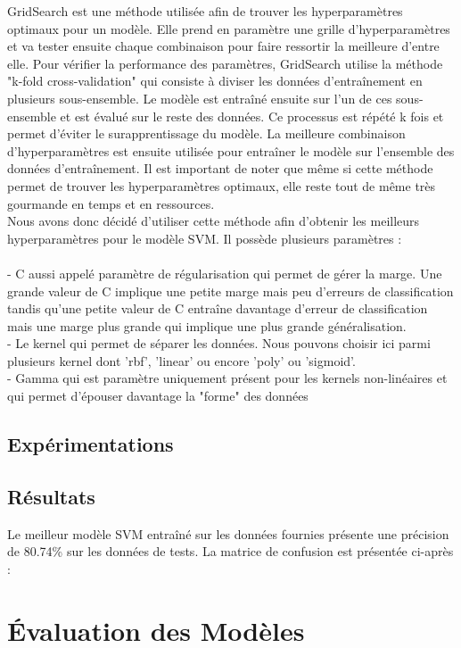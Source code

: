 \documentclass{rapport}
\begin{document}
GridSearch est une méthode utilisée afin de trouver les hyperparamètres optimaux pour un modèle. Elle prend en paramètre une grille
d'hyperparamètres et va tester ensuite chaque combinaison pour faire ressortir la meilleure d'entre elle. Pour vérifier la performance
des paramètres, GridSearch utilise la méthode "k-fold cross-validation" qui consiste à diviser les données d'entraînement en plusieurs
sous-ensemble. Le modèle est entraîné ensuite sur l'un de ces sous-ensemble et est évalué sur le reste des données. Ce processus est répété
k fois et permet d'éviter le surapprentissage du modèle. La meilleure combinaison d'hyperparamètres est ensuite utilisée pour entraîner le modèle
sur l'ensemble des données d'entraînement. Il est important de noter que même si cette méthode permet de trouver les hyperparamètres optimaux, elle
reste tout de même très gourmande en temps et en ressources.\\

Nous avons donc décidé d'utiliser cette méthode afin d'obtenir les meilleurs hyperparamètres pour le modèle SVM. Il possède plusieurs paramètres :\\
\\- C aussi appelé paramètre de régularisation qui permet de gérer la marge. Une grande valeur de C implique une petite marge mais peu d'erreurs de classification
tandis qu'une petite valeur de C entraîne davantage d'erreur de classification mais une marge plus grande qui implique une plus grande généralisation.\\
- Le kernel qui permet de séparer les données. Nous pouvons choisir ici parmi plusieurs kernel dont 'rbf', 'linear' ou encore
'poly' ou 'sigmoid'.\\
- Gamma qui est paramètre uniquement présent pour les kernels non-linéaires et qui permet d'épouser davantage la "forme" des données
\subsection{Expérimentations}
\subsection{Résultats}

Le meilleur modèle SVM entraîné sur les données fournies présente une précision de 80.74\% sur les données de tests. La matrice de confusion est présentée ci-après :


\section{Évaluation des Modèles}
\end{document}
